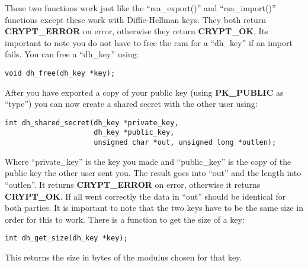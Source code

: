 \documentclass{book}
\begin{document}
These two functions work just like the ``rsa\_export()'' and ``rsa\_import()'' functions except these work with 
Diffie-Hellman keys.  They both return {\bf CRYPT\_ERROR} on error, otherwise they return {\bf CRYPT\_OK}.   
Its important to note you do not have to free the ram for a ``dh\_key'' if an import fails.  You can free a 
``dh\_key'' using:
\begin{verbatim}
void dh_free(dh_key *key);
\end{verbatim}
After you have exported a copy of your public key (using {\bf PK\_PUBLIC} as ``type'') you can now create a shared secret 
with the other user using:
\begin{verbatim}
int dh_shared_secret(dh_key *private_key, 
                     dh_key *public_key, 
                     unsigned char *out, unsigned long *outlen);
\end{verbatim}

Where ``private\_key'' is the key you made and ``public\_key'' is the copy of the public key the other user sent you.  The result goes
into ``out'' and the length into ``outlen''.  It returns {\bf CRYPT\_ERROR} on error, otherwise it returns
{\bf CRYPT\_OK}.  If all went correctly the data in ``out'' should be identical for both parties.  It is important to
note that the two keys have to be the same size in order for this to work.  There is a function to get the size of a
key:
\begin{verbatim}
int dh_get_size(dh_key *key);
\end{verbatim}
This returns the size in bytes of the modulus chosen for that key.
\end{document}
